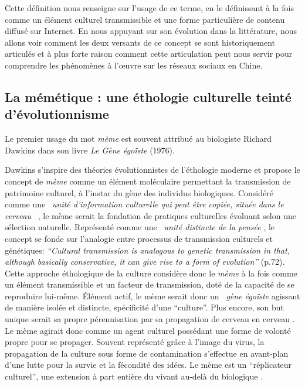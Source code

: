  Cette définition nous renseigne sur l{\textquoteright}usage de ce terme, en le définissant à la fois comme un élément culturel transmissible et une forme particulière de contenu diffusé sur Internet. En nous appuyant sur son évolution dans la littérature, nous allons voir comment les deux versants de ce concept se sont historiquement articulés et à plus forte raison comment cette articulation peut nous servir pour comprendre les phénomènes à l{\textquoteright}{\oe}uvre sur les réseaux sociaux en Chine. 

\subsection[La mémétique : une éthologie culturelle teinté d'évolutionnisme]{La mémétique : une éthologie culturelle teinté d{\textquoteright}évolutionnisme}

Le premier usage du mot \textit{mème} est souvent attribué au biologiste Richard Dawkins dans son livre \textit{Le Gène égo\"iste }(1976).

Dawkins s'inspire des théories évolutionnistes de l{\textquoteright}éthologie moderne et propose le concept de \textit{mème} comme un élément moléculaire permettant la transmission de patrimoine culturel, à l'instar du gène des individus biologiques. Considéré comme une \textit{{\guillemotleft}~unité d{\textquoteright}information culturelle qui peut être copiée, située dans le cerveau~{\guillemotright}} \citep{Blackmore2001}, le mème serait la fondation de pratiques culturelles évoluant selon une sélection naturelle. Représenté comme une {\guillemotleft}~\textit{unité distincte de la pensée {\guillemotright}} \citep{Dawkins1989}, le concept se fonde sur l{\textquoteright}analogie entre processus de transmission culturels et génétiques: \textit{{\textquotedblleft}Cultural transmission is analogous to genetic transmission in that, although basically conservative, it can give rise to a form of evolution{\textquotedblright} }(p.72)\textit{.} Cette approche éthologique de la culture considère donc le \textit{mème} à la fois comme un élément transmissible et un facteur de transmission, doté de la capacité de se reproduire lui-même. \'Elément actif, le mème serait donc un \textit{{\guillemotleft}~gène égo\"iste {\guillemotright} }agissant de manière isolée et distincte, spécificité d{\textquoteright}une {\textquotedblleft}culture{\textquotedblright}. Plus encore, son but unique serait sa propre pérennisation par sa propagation de cerveau en cerveau \citep{Blackmore1997}. Le mème agirait donc comme un agent culturel possédant une forme de volonté propre pour se propager. Souvent représenté gr\^ace à l{\textquoteright}image du virus, la propagation de la culture sous forme de contamination s'effectue en avant-plan d'une lutte pour la survie et la fécondité des idées. Le mème est un {\textquotedblleft}réplicateur culturel{\textquotedblright}, une extension à part entière du vivant au-delà du biologique \citep{Bloom2000}. 


